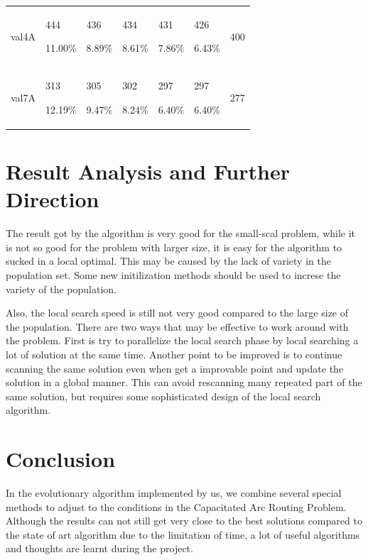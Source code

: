 \documentclass[journal,twoside,web]{ieeecolor}
\begin{document}
\begin{table}
\begin{tabular}{|p{40pt}|p{28pt}|p{28pt}|p{28pt}|p{28pt}|p{28pt}|p{30pt}|}
       val4A       & 444 \par 11.00\%     & 436  \par 8.89\% & 434 \par 8.61\%  & 431 \par 7.86\% & 426\par 6.43\%& 400    \\
       val7A       & 313 \par 12.19\%   & 305 \par 9.47\%   & 302 \par 8.24\%     & 297 \par 6.40\% & 297 \par 6.40\%  & 277     \\ \hline

\end{tabular}
\label{tab1}
\end{table}

\section{Result Analysis and Further Direction}
The result got by the algorithm is very good for the small-scal problem, while it is not so good for the problem with larger size, it is easy for the algorithm to sucked in a local optimal. This may be caused by the lack of variety in the population set. Some new initilization methods should be used to increse the variety of the population.\par
Also, the local search speed is still not very good compared to the large size of the population. There are two ways that may be effective to work around with the problem. First is try to parallelize the local search phase by local searching a lot of solution at the same time. Another point to  be improved is to continue scanning the same solution even when get a improvable point and update the solution in a global manner. This can avoid rescanning many repeated part of the same solution, but requires some sophisticated design of the local search algorithm.

\section{Conclusion}
In the evolutionary algorithm implemented by us, we combine several special methods to adjust to the conditions in the Capacitated Arc Routing Problem. Although the results can not still get very close to the best solutions compared to the state of art algorithm due to the limitation of time, a lot of useful algorithms and thoughts are learnt during the project.

 



\end{document}
